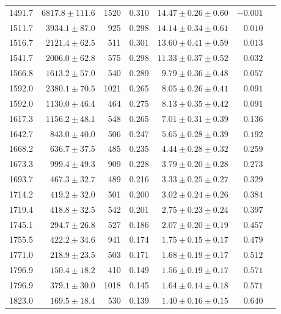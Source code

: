 \begin{tabular}{r r r r r r r}
  1491.7 & $6817.8 \pm 111.6$ &  1520 & 0.310 & $ 14.47 \pm 0.26 \pm 0.60$ & $ -0.001$ \\
  1511.7 & $3934.1 \pm  87.0$ &   925 & 0.298 & $ 14.14 \pm 0.34 \pm 0.61$ & $  0.010$ \\
  1516.7 & $2121.4 \pm  62.5$ &   511 & 0.301 & $ 13.60 \pm 0.41 \pm 0.59$ & $  0.013$ \\
  1541.7 & $2006.0 \pm  62.8$ &   575 & 0.298 & $ 11.33 \pm 0.37 \pm 0.52$ & $  0.032$ \\
  1566.8 & $1613.2 \pm  57.0$ &   540 & 0.289 & $  9.79 \pm 0.36 \pm 0.48$ & $  0.057$ \\
  1592.0 & $2380.1 \pm  70.5$ &  1021 & 0.265 & $  8.05 \pm 0.26 \pm 0.41$ & $  0.091$ \\
  1592.0 & $1130.0 \pm  46.4$ &   464 & 0.275 & $  8.13 \pm 0.35 \pm 0.42$ & $  0.091$ \\
  1617.3 & $1156.2 \pm  48.1$ &   548 & 0.265 & $  7.01 \pm 0.31 \pm 0.39$ & $  0.136$ \\
  1642.7 & $ 843.0 \pm  40.0$ &   506 & 0.247 & $  5.65 \pm 0.28 \pm 0.39$ & $  0.192$ \\
  1668.2 & $ 636.7 \pm  37.5$ &   485 & 0.235 & $  4.44 \pm 0.28 \pm 0.32$ & $  0.259$ \\
  1673.3 & $ 999.4 \pm  49.3$ &   909 & 0.228 & $  3.79 \pm 0.20 \pm 0.28$ & $  0.273$ \\
  1693.7 & $ 467.3 \pm  32.7$ &   489 & 0.216 & $  3.33 \pm 0.25 \pm 0.27$ & $  0.329$ \\
  1714.2 & $ 419.2 \pm  32.0$ &   501 & 0.200 & $  3.02 \pm 0.24 \pm 0.26$ & $  0.384$ \\
  1719.4 & $ 418.8 \pm  32.5$ &   542 & 0.201 & $  2.75 \pm 0.23 \pm 0.24$ & $  0.397$ \\
  1745.1 & $ 294.7 \pm  26.8$ &   527 & 0.186 & $  2.07 \pm 0.20 \pm 0.19$ & $  0.457$ \\
  1755.5 & $ 422.2 \pm  34.6$ &   941 & 0.174 & $  1.75 \pm 0.15 \pm 0.17$ & $  0.479$ \\
  1771.0 & $ 218.9 \pm  23.5$ &   503 & 0.171 & $  1.68 \pm 0.19 \pm 0.17$ & $  0.512$ \\
  1796.9 & $ 150.4 \pm  18.2$ &   410 & 0.149 & $  1.56 \pm 0.19 \pm 0.17$ & $  0.571$ \\
  1796.9 & $ 379.1 \pm  30.0$ &  1018 & 0.145 & $  1.64 \pm 0.14 \pm 0.18$ & $  0.571$ \\
  1823.0 & $ 169.5 \pm  18.4$ &   530 & 0.139 & $  1.40 \pm 0.16 \pm 0.15$ & $  0.640$ \\

\end{tabular}
